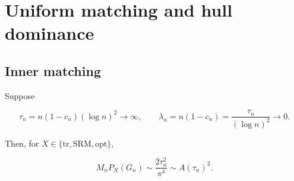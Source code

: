 \section{Uniform matching and hull dominance}
\label{supp:matching}

\subsection{Inner matching}

\begin{theorem}
\label{thm:supp-inner-matching}
Suppose

\begin{equation}\label{eq:supp-inner-assumptions}
 \tau_n=n(1-c_n)(\log n)^2\longrightarrow\infty,
 \qquad
 \lambda_n=n(1-c_n)=\frac{\tau_n}{(\log n)^2}\longrightarrow0.
\end{equation}

Then, for \(X\in\{\mathrm{tr},\mathrm{SRM},\mathrm{opt}\}\),

\begin{equation}\label{eq:supp-inner-conclusion}
 M_nP_X(G_n)\sim\frac{2\tau_n^2}{\pi^4}
 \sim A(\tau_n)^2.
\end{equation}
\end{theorem}

